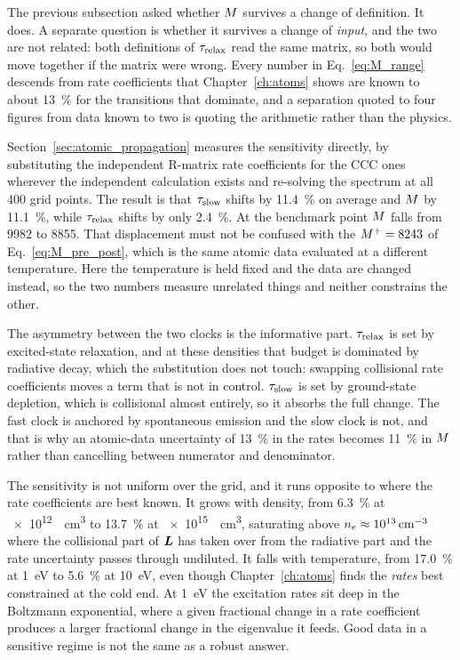 The previous subsection asked whether $M$ survives a change of definition.
It does. A separate question is whether it survives a change of \emph{input},
and the two are not related: both definitions of $\tau_{\mathrm{relax}}$ read the same matrix,
so both would move together if the matrix were wrong. Every number in
Eq.~\eqref{eq:M_range} descends from rate coefficients that
Chapter~\ref{ch:atoms} shows are known to about \SI{13}{\percent} for the
transitions that dominate, and a separation quoted to four figures from data
known to two is quoting the arithmetic rather than the physics.

Section~\ref{sec:atomic_propagation} measures the sensitivity directly, by
substituting the independent R-matrix rate coefficients for the CCC ones
wherever the independent calculation exists and re-solving the spectrum at all
400 grid points. The result is that $\tau_{\mathrm{slow}}$ shifts by \SI{11.4}{\percent} on
average and $M$ by \SI{11.1}{\percent}, while $\tau_{\mathrm{relax}}$ shifts by only
\SI{2.4}{\percent}. At the benchmark point $M$ falls from 9982 to 8855.
That displacement must not be confused with the $M^+ = 8243$ of
Eq.~\eqref{eq:M_pre_post}, which is the same atomic data evaluated at a
different temperature. Here the temperature is held fixed and the data are
changed instead, so the two numbers measure unrelated things and neither
constrains the other.

The asymmetry between the two clocks is the informative part. $\tau_{\mathrm{relax}}$ is set
by excited-state relaxation, and at these densities that budget is dominated by
radiative decay, which the substitution does not touch: swapping collisional
rate coefficients moves a term that is not in control. $\tau_{\mathrm{slow}}$ is set by
ground-state depletion, which is collisional almost entirely, so it absorbs the
full change. The fast clock is anchored by spontaneous emission and the slow
clock is not, and that is why an atomic-data uncertainty of \SI{13}{\percent} in
the rates becomes \SI{11}{\percent} in $M$ rather than cancelling between
numerator and denominator.

The sensitivity is not uniform over the grid, and it runs opposite to where the
rate coefficients are best known. It grows with density, from
\SI{6.3}{\percent} at \SI{e12}{\per\cubic\centi\metre} to
\SI{13.7}{\percent} at \SI{e15}{\per\cubic\centi\metre}, saturating above
$n_e \approx \SI{e13}{\per\cubic\centi\metre}$ where the collisional part of
$\bm{L}$ has taken over from the radiative part and the rate uncertainty passes
through undiluted. It falls with temperature, from \SI{17.0}{\percent} at
\SI{1}{\electronvolt} to \SI{5.6}{\percent} at \SI{10}{\electronvolt}, even
though Chapter~\ref{ch:atoms} finds the \emph{rates} best constrained at the
cold end. At \SI{1}{\electronvolt} the excitation rates sit deep in the
Boltzmann exponential, where a given fractional change in a rate coefficient
produces a larger fractional change in the eigenvalue it feeds. Good data in a
sensitive regime is not the same as a robust answer.

